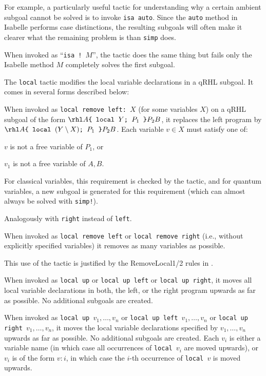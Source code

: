 \documentclass{article}
\begin{document}
For example, a particularly useful tactic for understanding why a
certain ambient subgoal cannot be solved is to invoke \texttt{isa
  auto}. Since the \texttt{auto} method in Isabelle performs case
distinctions, the resulting subgoals will often make it clearer what
the remaining problem is than \texttt{simp} does.

When invoked as ``\texttt{isa ! $M$}'', the tactic does the same thing
but fails only the Isabelle method $M$ completely solves the first
subgoal.



The \texttt{local} tactic modifies the local variable declarations in
a qRHL subgoal. It comes in several forms described below:

When invoked as \texttt{local remove left: $X$} (for some variables $X$) on a
qRHL subgoal of the form $\rhl A{\texttt{\{~local $Y$;
    $P_1$~\}}}{P_2} B$, it replaces the left program by
$\rhl A{\texttt{\{~local $(Y\setminus X)$; $P_1$~\}}}{P_2} B$.
Each variable $v\in X$ must satisfy one of:
\begin{compactitem}
  \item $v$ is not a free variable of $P_1$, or
  \item $v_1$ is not a free variable of $A,B$.
\end{compactitem}
For classical variables, this requirement is checked by the tactic,
and for quantum variables, a new subgoal is generated for this
requirement (which can almost always be solved with \texttt{simp!}).

Analogously with \texttt{right} instead of \texttt{left}.

When invoked as \texttt{local remove left} or \texttt{local remove
  right} (i.e., without explicitly specified variables) it removes as
many variables as possible.

This use of the tactic is justified by the RemoveLocal1/2 rules in
\cite{local-variables}.

\bigskip

When invoked as \texttt{local up} or \texttt{local up left} or
\texttt{local up right}, it moves all local variable declarations in
both, the left, or the right program upwards as far as possible. No
additional subgoals are created.

\bigskip

When invoked as \texttt{local up $v_1,\dots,v_n$} or \texttt{local up
  left $v_1,\dots,v_n$} or \texttt{local up right $v_1,\dots,v_n$}, it
moves the local variable declarations specified by $v_1,\dots,v_n$
upwards as far as possible. No additional subgoals are created. Each
$v_i$ is either a variable name (in which case all occurrences of
\texttt{local\ $v_i$} are moved upwards), or $v_i$ is of the form
$v:i$, in which case the $i$-th occurrence of \texttt{local\ $v$} is
moved upwards.
\end{document}

